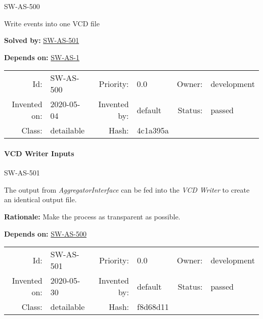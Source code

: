 \hypertarget{SW-AS-500}{SW-AS-500} 
\label{SW-AS-500}

Write events into one VCD file





 \textbf{Solved by:}
 \hyperlink{SW-AS-501}{SW-AS-501} 


 \textbf{Depends on:}
 \hyperlink{SW-AS-1}{SW-AS-1} 




\par{\small \begin{center}
\begin{tabular}{rlrlrl}
   Id: & SW-AS-500               & Priority: & 0.0          & Owner: & development \\
   Invented on: & 2020-05-04 & Invented by: & default & Status: & passed \\
   Class: & detailable & Hash: & 4c1a395a
\end{tabular}\end{center}
}

\paragraph{VCD Writer Inputs}

\hypertarget{SW-AS-501}{SW-AS-501} 
\label{SW-AS-501}

The output from \emph{AggregatorInterface} can be fed into the \emph{VCD Writer} to create an identical output file.


\textbf{Rationale:} Make the process as transparent as possible.






 \textbf{Depends on:}
 \hyperlink{SW-AS-500}{SW-AS-500} 




\par{\small \begin{center}
\begin{tabular}{rlrlrl}
   Id: & SW-AS-501               & Priority: & 0.0          & Owner: & development \\
   Invented on: & 2020-05-30 & Invented by: & default & Status: & passed \\
   Class: & detailable & Hash: & f8d68d11
\end{tabular}\end{center}
}
